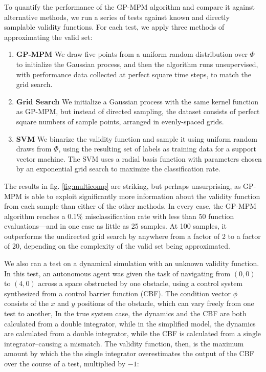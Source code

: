 \documentclass[12pt, conference]{IEEEtran}
\begin{document}
To quantify the performance of the GP-MPM algorithm and compare it against alternative methods, we run a series of tests against known and directly samplable validity functions. For each test, we apply three methods of approximating the valid set:

\begin{enumerate}
    \item \textbf{GP-MPM} We draw five points from a uniform random distribution over $\Phi$ to initialize the Gaussian process, and then the algorithm runs unsupervised, with performance data collected at perfect square time steps, to match the grid search.
    \item \textbf{Grid Search} We initialize a Gaussian process with the same kernel function as GP-MPM, but instead of directed sampling, the dataset consists of perfect square numbers of sample points, arranged in evenly-spaced grids.
    \item \textbf{SVM} We binarize the validity function and sample it using uniform random draws from $\Phi$, using the resulting set of labels as training data for a support vector machine. The SVM uses a radial basis function with parameters chosen by an exponential grid search to maximize the classification rate.
\end{enumerate}

The results in fig. \ref{fig:multicomp} are striking, but perhaps unsurprising, as GP-MPM is able to exploit significantly more information about the validity function from each sample than either of the other methods. In every case, the GP-MPM algorithm reaches a 0.1\% misclassification rate with less than 50 function evaluations---and in one case as little as 25 samples. At 100 samples, it outperforms the undirected grid search by anywhere from a factor of 2 to a factor of 20, depending on the complexity of the valid set being approximated.

We also ran a test on a dynamical simulation with an unknown validity function. In this test, an autonomous agent was given the task of navigating from $(0,0)$ to $(4,0)$ across a space obstructed by one obstacle, using a control system synthesized from a control barrier function (CBF). The condition vector $\phi$ consists of the $x$ and $y$ positions of the obstacle, which can vary freely from one test to another, In the true system case, the dynamics and the CBF are both calculated from a double integrator, while in the simplified model, the dynamics are calculated from a double integrator, while the CBF is calculated from a single integrator--causing a mismatch. The validity function, then, is the maximum amount by which the the single integrator overestimates the output of the CBF over the course of a test, multiplied by $-1$:
\end{document}
